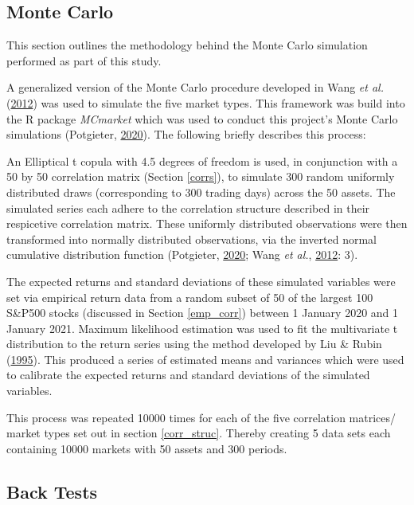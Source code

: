 \documentclass[11pt,preprint, authoryear]{elsarticle}
\numberwithin{equation}{section}
\numberwithin{figure}{section}
\numberwithin{table}{section}
\begin{document}
\hypertarget{monte-carlo}{%
\subsection{Monte Carlo}\label{monte-carlo}}

This section outlines the methodology behind the Monte Carlo simulation
performed as part of this study.

A generalized version of the Monte Carlo procedure developed in Wang
\emph{et al.} (\protect\hyperlink{ref-wang2012}{2012}) was used to
simulate the five market types. This framework was build into the R
package \emph{MCmarket} which was used to conduct this project's Monte
Carlo simulations (Potgieter, \protect\hyperlink{ref-MCmarket}{2020}).
The following briefly describes this process:

An Elliptical t copula with 4.5 degrees of freedom is used, in
conjunction with a 50 by 50 correlation matrix (Section \ref{corrs}), to
simulate 300 random uniformly distributed draws (corresponding to 300
trading days) across the 50 assets. The simulated series each adhere to
the correlation structure described in their respicetive correlation
matrix. These uniformly distributed observations were then transformed
into normally distributed observations, via the inverted normal
cumulative distribution function (Potgieter,
\protect\hyperlink{ref-MCmarket}{2020}; Wang \emph{et al.},
\protect\hyperlink{ref-wang2012}{2012}: 3).

The expected returns and standard deviations of these simulated
variables were set via empirical return data from a random subset of 50
of the largest 100 S\&P500 stocks (discussed in Section \ref{emp_corr})
between 1 January 2020 and 1 January 2021. Maximum likelihood estimation
was used to fit the multivariate t distribution to the return series
using the method developed by Liu \& Rubin
(\protect\hyperlink{ref-liu1995}{1995}). This produced a series of
estimated means and variances which were used to calibrate the expected
returns and standard deviations of the simulated variables.

This process was repeated 10000 times for each of the five correlation
matrices/ market types set out in section \ref{corr_struc}. Thereby
creating 5 data sets each containing 10000 markets with 50 assets and
300 periods.

\hypertarget{back-tests}{%
\subsection{Back Tests}\label{back-tests}}
\end{document}
